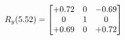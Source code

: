 \documentclass[preview]{standalone}
\begin{document}
\begin{align*}
\special{dvisvgm:raw <g id='unique000'>}R_{y}(5.52) = \begin{bmatrix}+0.72 & 0 & -0.69 \\0 & 1 & 0 \\+0.69 & 0 & +0.72\end{bmatrix}\special{dvisvgm:raw </g>}
\end{align*}
\end{document}
